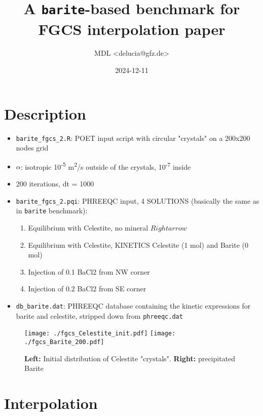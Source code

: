 \documentclass[a4paper, 9pt]{article}
\author{MDL <delucia@gfz.de>}
\date{2024-12-11}
\title{A \texttt{barite}-based benchmark for FGCS interpolation paper}
\begin{document}
\maketitle

\section{Description}
\label{sec:org739879a}

\begin{itemize}
\item \texttt{barite\_fgcs\_2.R}: POET input script with circular
  "crystals" on a 200x200 nodes grid

\item \(\alpha\): isotropic 10\textsuperscript{-5}
  m\textsuperscript{2}/s outside of the crystals,
  10\textsuperscript{-7} inside
\item 200 iterations, dt = 1000 
\item \texttt{barite\_fgcs\_2.pqi}: PHREEQC input, 4 SOLUTIONS
  (basically the same as in \texttt{barite} benchmark):
  \begin{enumerate}
  \item Equilibrium with Celestite, no mineral \(Rightarrow\)
  \item Equilibrium with Celestite, KINETICS Celestite (1 mol) and
    Barite (0 mol)
  \item Injection of 0.1 BaCl2 from NW corner
  \item Injection of 0.2 BaCl2 from SE corner
\end{enumerate}

\item \texttt{db\_barite.dat}: PHREEQC database containing the kinetic
  expressions for barite and celestite, stripped down from
  \texttt{phreeqc.dat}
\end{itemize}

\begin{figure}[htbp]
  \centering
  \texttt{[image: ./fgcs\_Celestite\_init.pdf]}
  \texttt{[image: ./fgcs\_Barite\_200.pdf]}
  \caption{\textbf{Left:} Initial distribution of Celestite
    "crystals". \textbf{Right:} precipitated Barite}
\end{figure}

\section{Interpolation}
\label{sec:org2a09431}
\end{document}
